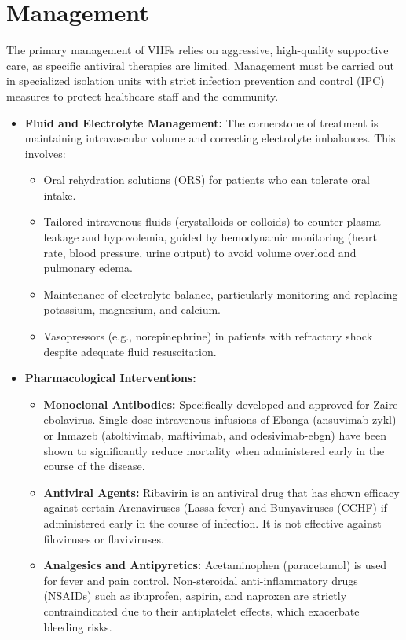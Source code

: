 \section*{Management}
The primary management of VHFs relies on aggressive, high-quality supportive care, as specific antiviral therapies are limited. Management must be carried out in specialized isolation units with strict infection prevention and control (IPC) measures to protect healthcare staff and the community.

\begin{itemize}
\item \textbf{Fluid and Electrolyte Management:} The cornerstone of treatment is maintaining intravascular volume and correcting electrolyte imbalances. This involves:
  \begin{itemize}
  \item Oral rehydration solutions (ORS) for patients who can tolerate oral intake.
  \item Tailored intravenous fluids (crystalloids or colloids) to counter plasma leakage and hypovolemia, guided by hemodynamic monitoring (heart rate, blood pressure, urine output) to avoid volume overload and pulmonary edema.
  \item Maintenance of electrolyte balance, particularly monitoring and replacing potassium, magnesium, and calcium.
  \item Vasopressors (e.g., norepinephrine) in patients with refractory shock despite adequate fluid resuscitation.
  \end{itemize}
\item \textbf{Pharmacological Interventions:}
  \begin{itemize}
  \item \textbf{Monoclonal Antibodies:} Specifically developed and approved for Zaire ebolavirus. Single-dose intravenous infusions of Ebanga (ansuvimab-zykl) or Inmazeb (atoltivimab, maftivimab, and odesivimab-ebgn) have been shown to significantly reduce mortality when administered early in the course of the disease.
  \item \textbf{Antiviral Agents:} Ribavirin is an antiviral drug that has shown efficacy against certain Arenaviruses (Lassa fever) and Bunyaviruses (CCHF) if administered early in the course of infection. It is not effective against filoviruses or flaviviruses.
  \item \textbf{Analgesics and Antipyretics:} Acetaminophen (paracetamol) is used for fever and pain control. Non-steroidal anti-inflammatory drugs (NSAIDs) such as ibuprofen, aspirin, and naproxen are strictly contraindicated due to their antiplatelet effects, which exacerbate bleeding risks.

\end{itemize}
\end{itemize}

